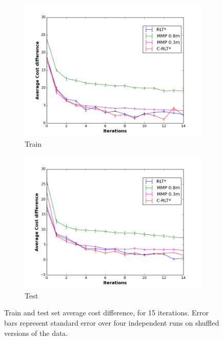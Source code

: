 \documentclass{article}  %
\begin{document}
\begin{figure}[tbh]
	\centering
      \hspace{-5mm}
      \begin{subfigure}[b]{0.455\columnwidth}

    \includegraphics[clip=true,width=1.25\textwidth]{images/cost_diff_train.png}
    \caption{Train}
    \label{fig:train_results}
  \end{subfigure}
 \hspace{5mm}
  \begin{subfigure}[b]{0.455\columnwidth}
    \includegraphics[clip=true,width=1.25\textwidth]{images/cost_diff_val.png}
    \caption{Test}
    \label{fig:test_results}
  \end{subfigure} 

  \caption{Train and test set average cost difference, for 15 iterations. Error bars represent standard error over four independent runs on shuffled versions of the data.}
  \label{fig:results}
\end{figure}
\end{document}
